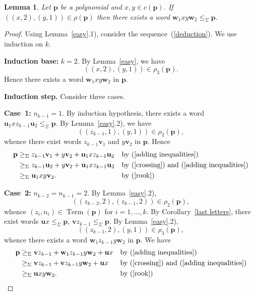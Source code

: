 \documentclass[12pt,draft]{amsart}
\newtheorem{lemma}{Lemma}
\DeclareMathOperator{\term}{Term}
\begin{document}
\begin{lemma} 
\label{inner letters} Let $\mathbf p$ be a polynomial and $x,y\in c(\mathbf p)$. If $((x,2),(y,1))\in\rho(\mathbf p)$ then there exists a word $\mathbf w_1xy\mathbf w_2\le_{\Sigma}\mathbf p$. 
\end{lemma}
\begin{proof}
Using Lemma~\ref{easy}.1), consider the sequence~(\ref{deduction}). We use induction on $k$.

\textbf{Induction base:} $k=2$. By Lemma~\ref{easy}, we have 
$$((x,2),(y,1))\in\rho_3(\mathbf p).$$ 
Hence there exists a word $\mathbf w_1xy\mathbf w_2$ in $\mathbf p$.

\textbf{Induction step.} Consider three cases.

\textbf{Case~1:} $n_{k-1}=1$. By induction hypothesis, there exists a word $\mathbf u_1xz_{k-1}\mathbf u_2\le_{\Sigma}\mathbf p$. By Lemma~\ref{easy}.2), we have 
$$((z_{k-1},1),(y,1))\in\rho_2(\mathbf p),$$
whence there exist words $z_{k-1}\mathbf v_1$ and $y\mathbf v_2$ in $\mathbf p$. Hence
\begin{align*}
\mathbf p&\ge_{\Sigma}z_{k-1}\mathbf v_1+y\mathbf v_2+\mathbf u_1xz_{k-1}\mathbf u_2&&\text{by~(\ref{adding inequalities})}\\
&\ge_{\Sigma}z_{k-1}\mathbf u_2+y\mathbf v_2+\mathbf u_1xz_{k-1}\mathbf u_2&&\text{by~(\ref{crossing}) and~(\ref{adding inequalities})}\\
&\ge_{\Sigma}\mathbf u_1xy\mathbf v_2.&&\text{by~(\ref{rook})}
\end{align*}

\textbf{Case~2:} $n_{k-2}=n_{k-1}=2$. By Lemma~\ref{easy}.2), 
$$((z_{k-2},2),(z_{k-1},2))\in\rho_2(\mathbf p),$$ 
whence $(z_i,n_i)\in\term(\mathbf p)$ for $i=1,\dots,k$. By Corollary~\ref{last letters}, there exist words $\mathbf ux\le_{\Sigma}\mathbf p$, $\mathbf vz_{k-1}\le_{\Sigma}\mathbf p$. By Lemma~\ref{easy}.2), 
$$((z_{k-1},2),(y,1))\in\rho_3(\mathbf p),$$ 
whence there exists a word $\mathbf w_1z_{k-1}y\mathbf w_2$ in $\mathbf p$. We have
\begin{align*}
\mathbf p&\ge_{\Sigma}\mathbf vz_{k-1}+\mathbf w_1z_{k-1}y\mathbf w_2+\mathbf ux&&\text{by~(\ref{adding inequalities})}\\
&\ge_{\Sigma}\mathbf vz_{k-1}+\mathbf vz_{k-1}y\mathbf w_2+\mathbf ux&&\text{by~(\ref{crossing}) and~(\ref{adding inequalities})}\\
&\ge_{\Sigma}\mathbf uxy\mathbf w_2.&&\text{by~(\ref{rook})}
\end{align*}


\end{proof}
\end{document}
